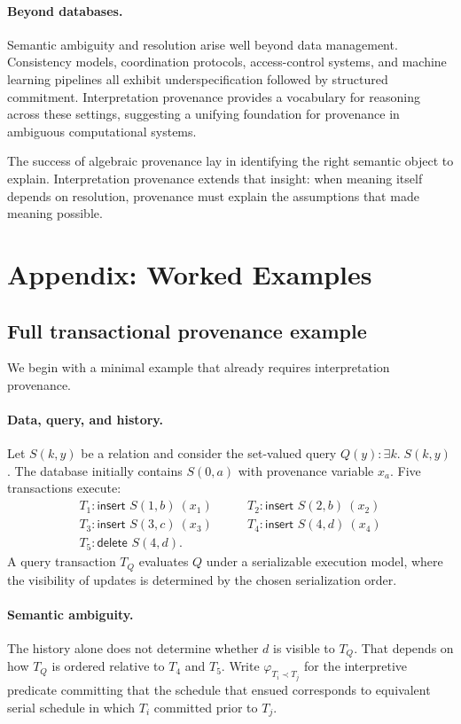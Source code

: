 \documentclass[acmsmall,nonacm]{acmart}
\theoremstyle{remark}
\numberwithin{definition}{section}
\numberwithin{theorem}{section}
\numberwithin{lemma}{section}
\numberwithin{corollary}{section}
\numberwithin{remark}{section}
\numberwithin{example}{section}
\numberwithin{observation}{section}
\numberwithin{assumption}{section}
\begin{document}
\paragraph{Beyond databases.}
Semantic ambiguity and resolution arise well beyond data management.
Consistency models, coordination protocols, access-control systems, and machine
learning pipelines all exhibit underspecification followed by structured
commitment.
Interpretation provenance provides a vocabulary for reasoning across these
settings, suggesting a unifying foundation for provenance in ambiguous
computational systems.

The success of algebraic provenance lay in identifying the right semantic object
to explain.
Interpretation provenance extends that insight: when meaning itself depends on
resolution, provenance must explain the assumptions that made meaning possible.

\appendix
\section{Appendix: Worked Examples}
\label{sec:appendix-examples}

\subsection{Full transactional provenance example}
\label{sec:appendix-concurrency}

We begin with a minimal example that already requires interpretation provenance.

\paragraph{Data, query, and history.}
Let $S(k,y)$ be a relation and consider the set-valued query $Q(y) : \exists k.\; S(k,y)$.
The database initially contains $S(0,a)$ with provenance variable $x_a$.
Five transactions execute:
\[
\begin{array}{ll}
T_1: \textsf{insert } S(1,b) \ (x_1) \qquad &
T_2: \textsf{insert } S(2,b) \ (x_2)\\
T_3: \textsf{insert } S(3,c) \ (x_3) \qquad &
T_4: \textsf{insert } S(4,d) \ (x_4)\\
T_5: \textsf{delete } S(4,d). &
\end{array}
\]
A query transaction $T_Q$ evaluates $Q$ under a
serializable execution model, where the visibility of updates is
determined by the chosen serialization order.

\paragraph{Semantic ambiguity.}
The history alone does not determine whether $d$ is visible to $T_Q$.
That depends on how $T_Q$ is ordered relative to $T_4$ and $T_5$.
Write $\varphi_{T_i \prec T_j}$ for the interpretive predicate committing
that the schedule that ensued corresponds to equivalent serial schedule in which
$T_i$ committed prior to $T_j$.
\end{document}
